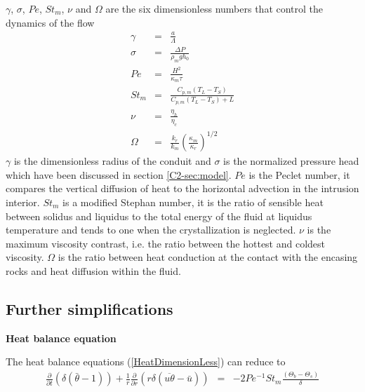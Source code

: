   $\gamma$, $\sigma$,  $Pe$, $St_m$,  $\nu$ and  $\Omega$ are  the six
  dimensionless numbers that control the dynamics of the flow
  \begin{eqnarray}
    \gamma&=&\frac{a}{\Lambda} \label{gamma}\\
    \sigma &=& \frac{\Delta P}{\rho_m g h_0} \label{sigma}\\
    Pe&=& \frac{H^2}{\kappa_m \tau}\label{Pe}\\
    St_m &=& \frac{C_{p,m}\left(T_L-T_S\right)}{C_{p,m}\left(T_L-T_S\right)+L} \label{St}\\
    \nu&=& \frac{\eta_h}{\eta_c}\label{nu}\\
    \Omega&=&\frac{k_r}{k_m}\left(\frac{\kappa_m}{\kappa_r}\right)^{1/2}\label{omega}
  \end{eqnarray}
  $\gamma$ is the dimensionless radius  of the conduit and $\sigma$ is
  the normalized  pressure head which  have been discussed  in section
  \ref{C2-sec:model}.   $Pe$ is  the  Peclet number,  it compares  the
  vertical  diffusion  of heat  to  the  horizontal advection  in  the
  intrusion interior. $St_m$  is a modified Stephan number,  it is the
  ratio of  sensible heat  between solidus and  liquidus to  the total
  energy of  the fluid at liquidus  temperature and tends to  one when
  the  crystallization is  neglected. $\nu$  is the  maximum viscosity
  contrast, i.e.  the ratio between the hottest and coldest viscosity.
  $\Omega$ is  the ratio between  heat conduction at the  contact with
  the encasing rocks and heat diffusion within the fluid.

  \subsection{Further simplifications}
  \label{C3-sec:furth-simpl}

  \textbf{Heat balance equation} \vspace{.5cm}

  The heat balance equations (\ref{HeatDimensionLess}) can reduce to
  \begin{eqnarray}
    \frac{\partial}{\partial
    t}\left( \delta( \bar{\theta}-1)\right)+\frac{1}{r}\frac{\partial}{\partial
    r}
    \left( r\delta(\overline{u\theta}-\bar{u})\right)&=&- 2Pe^{-1}St_m\frac{\left(\Theta_b-\Theta_s\right)}{\delta} 
                                                         \label{HeatD_a}
  \end{eqnarray}

